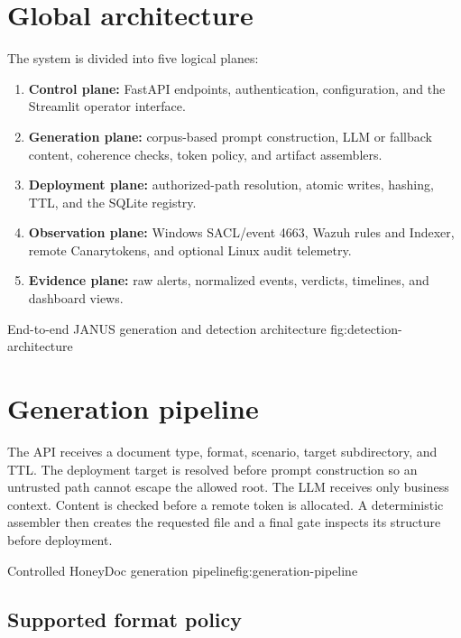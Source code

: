 \section{Global architecture}

The system is divided into five logical planes:

\begin{enumerate}[label=\arabic*.]
  \item \textbf{Control plane:} FastAPI endpoints, authentication, configuration,
  and the Streamlit operator interface.
  \item \textbf{Generation plane:} corpus-based prompt construction, LLM or
  fallback content, coherence checks, token policy, and artifact assemblers.
  \item \textbf{Deployment plane:} authorized-path resolution, atomic writes,
  hashing, TTL, and the SQLite registry.
  \item \textbf{Observation plane:} Windows SACL/event 4663, Wazuh rules and
  Indexer, remote Canarytokens, and optional Linux audit telemetry.
  \item \textbf{Evidence plane:} raw alerts, normalized events, verdicts,
  timelines, and dashboard views.
\end{enumerate}

{End-to-end JANUS generation and detection architecture}
{fig:detection-architecture}

\section{Generation pipeline}

The API receives a document type, format, scenario, target subdirectory, and
TTL. The deployment target is resolved before prompt construction so an
untrusted path cannot escape the allowed root. The LLM receives only business
context. Content is checked before a remote token is allocated. A deterministic
assembler then creates the requested file and a final gate inspects its
structure before deployment.

{Controlled HoneyDoc generation pipeline}{fig:generation-pipeline}

\subsection{Supported format policy}

